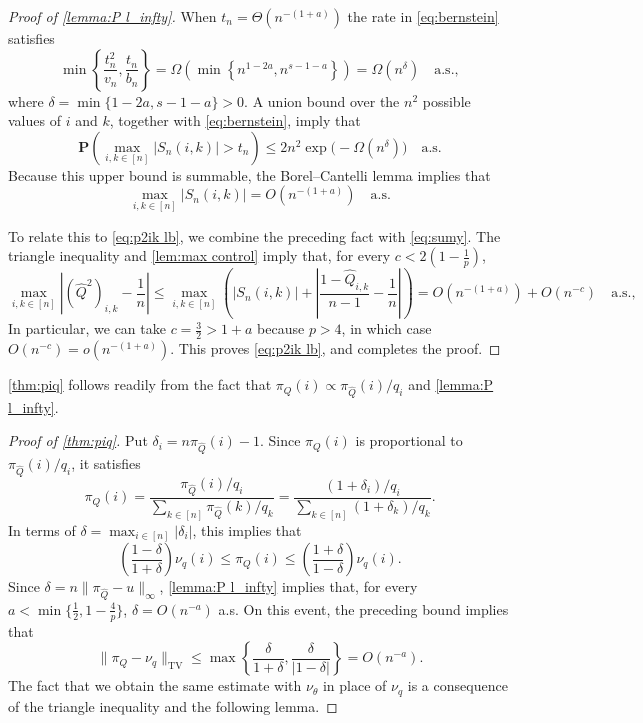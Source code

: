 \documentclass[12pt]{amsart}
\newcommand\wh[1]{\widehat{#1}}
\renewcommand{\P}{\mathbf{P}}
\DeclareMathOperator{\1}{\mathbf{1}}
\begin{document}
\begin{proof}[Proof of \cref{lemma:P l_infty}]
When $t_n = \Theta (n^{-(1+a)})$ the rate in \cref{eq:bernstein} satisfies
\[
	\min\left\{\frac{t_n^2}{v_n}, \frac{t_n}{b_n} \right\} = \Omega \left(\min \left\{ n^{1-2a}, n^{s-1-a}\right\}\right) = \Omega (n^{\delta}) \quad \mathrm{a.s.},
\]
where $\delta = \min\{1-2a,s-1-a\}> 0$. A union bound over the $n^2$ possible values of $i$ and $k$, together with \cref{eq:bernstein}, imply that
\[
	\P \left( \max_{i,k \in [n]} |S_n (i,k)| > t_n \right) \leq 2n^2 \exp \big(- \Omega(n^\delta) \big) \quad \mathrm{a.s.}
\]
Because this upper bound is summable, the Borel--Cantelli lemma implies that
\[
	\max_{i,k \in [n]} |S_n (i,k)| = O (n^{-(1+a)}) \quad \mathrm{a.s.}
\]

To relate this to \cref{eq:p2ik lb}, we combine the preceding fact with \cref{eq:sumy}. The triangle inequality and \cref{lem:max control} imply that, for every $c < 2(1-\frac{1}{p})$,
\[
	\max_{i,k \in [n]} \left| (\wh{Q}^2)_{i,k} - \frac1n \right| \leq \max_{i,k \in [n]} \left( \left| S_n (i,k) \right| + \left| \frac{1-\wh{Q}_{i,k}}{n-1} - \frac1n \right| \right) = O (n^{-(1+a)}) + O(n^{-c}) \quad \mathrm{a.s.},
\]
In particular, we can take $c = \frac{3}{2} > 1 + a$ because $p > 4$, in which case $O(n^{-c}) = o(n^{-(1+a)})$. This proves \cref{eq:p2ik lb}, and completes the proof.
\end{proof}

\cref{thm:piq} follows readily from the fact that $\pi_Q(i) \propto \pi_{\wh{Q}} (i)/q_i$ and \cref{lemma:P l_infty}.

\begin{proof}[Proof of \cref{thm:piq}]
	Put $\delta_i = n \pi_{\wh{Q}} (i) - 1$. Since $\pi_Q (i)$ is proportional to $\pi_{\wh{Q}} (i) / q_i$, it satisfies
	\[
		\pi_Q (i) = \frac{\pi_{\wh{Q}} (i) / q_i}{\sum_{k \in [n]} \pi_{\wh{Q}} (k) / q_k} = \frac{(1 + \delta_i) / q_i}{\sum_{k \in [n]} (1 + \delta_k) / q_k}.
	\]
	In terms of $\delta = \max_{i \in [n]} |\delta_i|$, this implies that
	\[
		\left( \frac{1-\delta}{1+\delta} \right) \nu_q (i) \leq \pi_Q (i) \leq \left( \frac{1+\delta}{1-\delta}\right) \nu_q (i).
	\]
	Since $\delta = n\|\pi_{\wh{Q}} - u\|_\infty$, \cref{lemma:P l_infty} implies that, for every $a < \min\{\frac12,1-\frac{4}{p}\}$, $\delta = O(n^{-a})$ a.s. On this event, the preceding bound implies that
	\[
		\| \pi_Q - \nu_q \|_{\mathrm{TV}} \leq \max \left\{\frac{\delta}{1 + \delta}, \frac{\delta}{|1 - \delta|} \right\} = O (n^{-a}).
	\]
    The fact that we obtain the same estimate with $\nu_\theta$ in place of $\nu_q$ is a consequence of the triangle inequality and the following lemma.
\end{proof}
\end{document}
